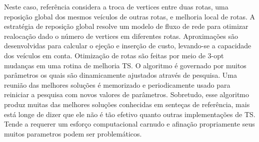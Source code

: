  Neste caso, {\color{red} referência} considera a troca de vertices entre duas rotas, uma reposição
global dos mesmos veículos de outras rotas, e melhoria local de rotas. A estratégia de reposição
global resolve um modelo de fluxo de rede para otimizar realocação dado o número de vertices em
diferentes rotas. Aproximações são desenvolvidas para calcular o ejeção e inserção de custo,
levando-se a capacidade dos veículos em conta. Otimização de rotas são feitas por meio de 3-opt
mudanças em uma rotina de melhoria TS. O algoritmo é governado por muitos parâmetros os quais são
dinamicamente ajustados através de pesquisa. Uma reunião das melhores soluções é memorizado e
periodicamente usado para reiniciar a pesquisa com novos valores de parâmetros. Sobretudo, esse
algoritmo produz muitas das melhores soluções conhecidas em senteças de referência, mais está longe
de dizer que ele não é tão efetivo quanto outras implementações de TS. Tende a requerer um esforço
computacional carnudo e afinação propriamente seus muitos parametros podem ser problemáticos.



